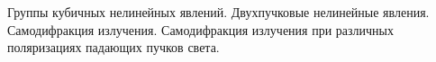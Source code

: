 
\begin{leftrules}
Группы кубичных нелинейных явлений. Двухпучковые нелинейные явления. Самодифракция излучения. Самодифракция излучения при различных поляризациях падающих пучков света.
\end{leftrules}